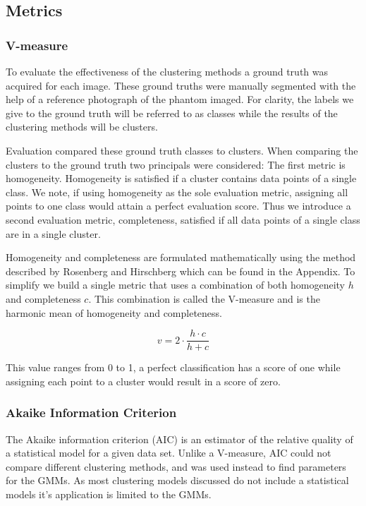 \documentclass[a4paper,11pt]{article}
\begin{document}
\subsection{Metrics}
\subsubsection{V-measure}

To evaluate the effectiveness of the clustering methods a ground truth was acquired for each image. These ground truths were manually segmented with the help of a reference photograph of the phantom imaged. For clarity, the labels we give to the ground truth will be referred to as classes while the results of the clustering methods will be clusters.

Evaluation compared these ground truth classes to clusters. When comparing the clusters to the ground truth two principals were considered: The first metric is homogeneity. Homogeneity is satisfied if a cluster contains data points of a single class. We note, if using homogeneity as the sole evaluation metric, assigning all points to one class would attain a perfect evaluation score. Thus we introduce a second evaluation metric, completeness, satisfied if all data points of a single class are in a single cluster. 

Homogeneity and completeness are formulated mathematically using the method described by Rosenberg and Hirschberg \cite{Rosenberg2007V-Measure:Measure} which can be found in the Appendix. To simplify we build a single metric that uses a combination of both homogeneity $h$ and completeness $c$. This combination is called the V-measure and is the harmonic mean of homogeneity and completeness.


\begin{equation}
v = 2 \cdot \frac{h \cdot c}{h + c}
\end{equation}

This value ranges from 0 to 1, a perfect classification has a score of one while assigning each point to a cluster would result in a score of zero.

\subsubsection{Akaike Information Criterion}

The Akaike information criterion (AIC) \cite{Akaike1998InformationPrinciple} is an estimator of the relative quality of a statistical model for a given data set. Unlike a V-measure, AIC could not compare different clustering methods, and was used instead to find parameters for the GMMs. As most clustering models discussed do not include a statistical models it's application is limited to the GMMs.
\end{document}
